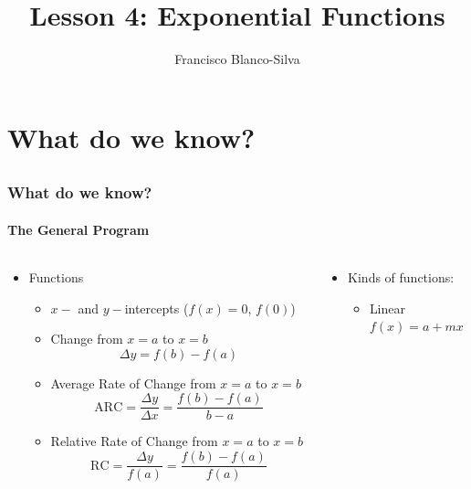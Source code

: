 \documentclass[9pt,xcolor=x11names,compress]{beamer}
\author[Francisco Blanco-Silva]{Francisco Blanco-Silva}
\institute[USC]{University of South Carolina}
\date{
    \begin{tikzpicture} 
    \draw [blue!75!black, rotate=90]
    [l-system={rule set={F -> FF-[-F+F]+[+F-F]}, axiom=F, order=4, step=2pt, 
        randomize step percent=25, angle=30, randomize angle percent=5}]
    lindenmayer system; 
    \end{tikzpicture}
    \\
}
\title{Lesson 4: Exponential Functions}
\begin{document}
\frame{\titlepage}

\section{What do we know?}
\subsection{}

\begin{frame}[t]
\frametitle{What do we know?}
\framesubtitle{The General Program}
\begin{columns}[t]
\begin{column}[t]{0.6\linewidth}
\begin{itemize}
\item Functions
\begin{itemize}
\item $x-$ and $y-$\alert{intercepts} ($f(x)=0$, $f(0)$)
\item \alert{Change} from $x=a$ to $x=b$ 
\begin{equation*}
    \Delta y = f(b)-f(a)
\end{equation*}
\item \alert{Average Rate of Change} from $x=a$ to $x=b$
\begin{equation*}
\text{ARC}=\frac{\Delta y}{\Delta x}=\frac{f(b)-f(a)}{b-a} 
\end{equation*}
\item \alert{Relative Rate of Change} from $x=a$ to $x=b$
\begin{equation*}
\text{RC} = \frac{\Delta y}{f(a)} = \frac{f(b) - f(a)}{f(a)}
\end{equation*}
\end{itemize}
\end{itemize}
\end{column}
\pause
\begin{column}[t]{0.4\linewidth}
\begin{itemize}
    \item Kinds of functions:
    \begin{itemize}
        \item \alert{Linear} \\ $f(x)=a + mx$
    \end{itemize}
\end{itemize}
\end{column}
\end{columns}
\end{frame}
\end{document}
